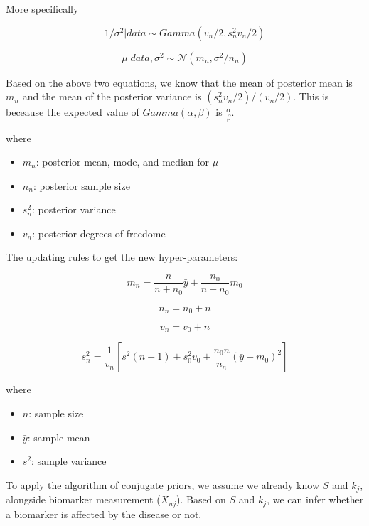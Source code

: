 \documentclass[
  letterpaper,
  DIV=11,
  numbers=noendperiod]{scrreprt}
\providecommand{\tightlist}{%
  \setlength{\itemsep}{0pt}\setlength{\parskip}{0pt}}\usepackage{longtable,booktabs,array}
\begin{document}
More specifically

\[1/\sigma^2 | data \sim Gamma(v_n/2, s_n^2 v_n/2)\]

\[\mu | data, \sigma^2 \sim \mathcal{N}(m_n, \sigma^2/n_n)\]

Based on the above two equations, we know that the mean of posterior
mean is \(m_n\) and the mean of the posterior variance is
\((s_n^2 v_n/2)/(v_n/2)\). This is beceause the expected value of
\(Gamma(\alpha, \beta)\) is \(\frac{\alpha}{\beta}\).

where

\begin{itemize}
\tightlist
\item
  \(m_n\): posterior mean, mode, and median for \(\mu\)
\item
  \(n_n\): posterior sample size
\item
  \(s_n^2\): posterior variance
\item
  \(v_n\): posterior degrees of freedome
\end{itemize}

The updating rules to get the new hyper-parameters:

\[m_n = \frac{n}{n+n_0} \bar{y} + \frac{n_0}{n+n_0}m_0\]

\[n_n = n_0 + n\]

\[v_n = v_0 + n\]

\[s_n^2 = \frac{1}{v_n}\left[s^2(n-1) + s_0^2v_0 + \frac{n_0n}{n_n}(\bar{y}-m_0)^2\right]\]

where

\begin{itemize}
\tightlist
\item
  \(n\): sample size
\item
  \(\bar{y}\): sample mean
\item
  \(s^2\): sample variance
\end{itemize}

\begin{tcolorbox}[enhanced jigsaw, breakable, bottomtitle=1mm, toprule=.15mm, colframe=quarto-callout-tip-color-frame, colbacktitle=quarto-callout-tip-color!10!white, arc=.35mm, bottomrule=.15mm, left=2mm, opacitybacktitle=0.6, toptitle=1mm, colback=white, opacityback=0, title=\textcolor{quarto-callout-tip-color}{\faLightbulb}\hspace{0.5em}{Tip}, titlerule=0mm, rightrule=.15mm, leftrule=.75mm, coltitle=black]

To apply the algorithm of conjugate priors, we assume we already know
\(S\) and \(k_j\), alongside biomarker measurement (\(X_{nj}\)). Based
on \(S\) and \(k_j\), we can infer whether a biomarker is affected by
the disease or not.

\end{tcolorbox}
\end{document}
